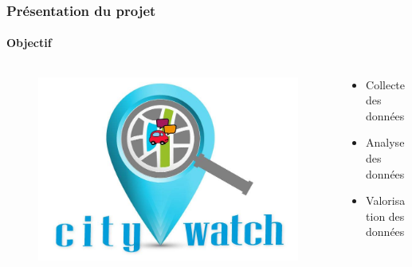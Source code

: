 \documentclass{beamer}
\begin{document}
\begin{frame}
    \frametitle{Présentation du projet}
    \framesubtitle{Objectif}
    \begin{columns}
        \begin{column}{0.5\textwidth}
            \begin{figure}
                \includegraphics[width=1\textwidth]{figures/logo-citywatch.jpg}
            \end{figure}
        \end{column}
        \begin{column}{0.5\textwidth}
            \begin{itemize}
                \item<1-> Collecte des données
                \item<2-> Analyse des données
                \item<3-> Valorisation des données
            \end{itemize}
        \end{column}
    \end{columns}
\end{frame}
\end{document}
